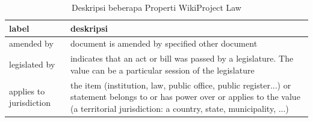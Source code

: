 \begin{table}
  \centering
  \begin{tabular}{|p{}|p{}|} \hline
    label                   & deskripsi                                                                                                                                                                                          \\\hline \hline
    amended by              & document is amended by specified other document                                                                                                                                                    \\\hline
    legislated by           & indicates that an act or bill was passed by a legislature. The value can be a particular session of the legislature                                                                                \\\hline
    applies to jurisdiction & the item (institution, law, public office, public register...) or statement belongs to or has power over or applies to the value (a territorial jurisdiction: a country, state, municipality, ...) \\\hline
  \end{tabular}
  \caption{Deskripsi beberapa Properti WikiProject Law}
  \label{tab:wp-desc}
\end{table}

